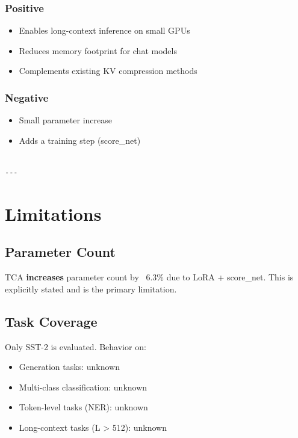 \subsubsection{Positive}
\begin{itemize}
\item Enables long-context inference on small GPUs
\item Reduces memory footprint for chat models
\item Complements existing KV compression methods

\end{itemize}
\subsubsection{Negative}
\begin{itemize}
\item Small parameter increase
\item Adds a training step (score\_net)
\end{itemize}
\begin{lstlisting}

---
\end{lstlisting}

\section{Limitations}

\subsection{Parameter Count}

TCA \textbf{increases} parameter count by ~6.3\% due to LoRA + score\_net. This is 
explicitly stated and is the primary limitation.

\subsection{Task Coverage}

Only SST-2 is evaluated. Behavior on:
\begin{itemize}
\item Generation tasks: unknown
\item Multi-class classification: unknown
\item Token-level tasks (NER): unknown
\item Long-context tasks (L > 512): unknown

\end{itemize}
